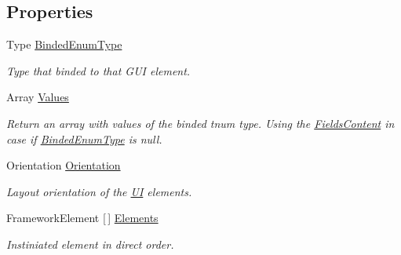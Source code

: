 \subsection*{Properties}
\begin{DoxyCompactItemize}
\item 
Type \mbox{\hyperlink{class_wpf_handler_1_1_u_i_1_1_controls_1_1_flat_toggles_group_abb4f90b5eace0651db2af6f293d312d1}{Binded\+Enum\+Type}}
\begin{DoxyCompactList}\small\item\em Type that binded to that G\+UI element. \end{DoxyCompactList}\item 
Array \mbox{\hyperlink{class_wpf_handler_1_1_u_i_1_1_controls_1_1_flat_toggles_group_a146fc04548cdc1df39cd8c9c1d4b3b00}{Values}}
\begin{DoxyCompactList}\small\item\em Return an array with values of the binded tnum type. Using the \mbox{\hyperlink{class_wpf_handler_1_1_u_i_1_1_controls_1_1_flat_toggles_group_a48c85f0f2ca803d28b95877dbc0122f0}{Fields\+Content}} in case if \mbox{\hyperlink{class_wpf_handler_1_1_u_i_1_1_controls_1_1_flat_toggles_group_abb4f90b5eace0651db2af6f293d312d1}{Binded\+Enum\+Type}} is null. \end{DoxyCompactList}\item 
Orientation \mbox{\hyperlink{class_wpf_handler_1_1_u_i_1_1_controls_1_1_flat_toggles_group_ab0cb4350ceae1f1288d6c83de4ed66c9}{Orientation}}
\begin{DoxyCompactList}\small\item\em Layout orientation of the \mbox{\hyperlink{namespace_wpf_handler_1_1_u_i}{UI}} elements. \end{DoxyCompactList}\item 
Framework\+Element \mbox{[}$\,$\mbox{]} \mbox{\hyperlink{class_wpf_handler_1_1_u_i_1_1_controls_1_1_flat_toggles_group_af11956552285c0b69219ab52362d3646}{Elements}}
\begin{DoxyCompactList}\small\item\em Instiniated element in direct order. \end{DoxyCompactList}\item 

\end{DoxyCompactItemize}
